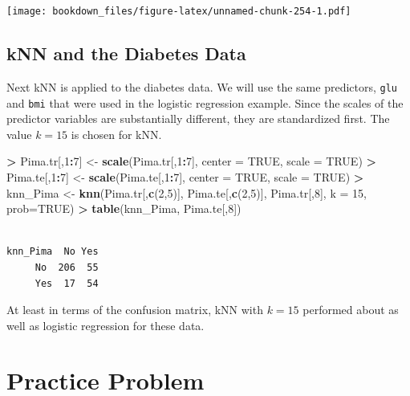 \documentclass[]{krantz}
\makeatletter
\newenvironment{Shaded}{\begin{snugshade}}{\end{snugshade}}
\newcommand{\KeywordTok}[1]{\textcolor[rgb]{0.27,0.27,0.27}{\textbf{#1}}}
\newcommand{\DataTypeTok}[1]{\textcolor[rgb]{0.27,0.27,0.27}{#1}}
\newcommand{\DecValTok}[1]{\textcolor[rgb]{0.06,0.06,0.06}{#1}}
\newcommand{\StringTok}[1]{\textcolor[rgb]{0.5,0.5,0.5}{#1}}
\newcommand{\OtherTok}[1]{\textcolor[rgb]{0.37,0.37,0.37}{#1}}
\newcommand{\OperatorTok}[1]{\textcolor[rgb]{0.43,0.43,0.43}{\textbf{#1}}}
\newcommand{\NormalTok}[1]{#1}
\newenvironment{kframe}{%
\medskip{}
\setlength{\fboxsep}{.8em}
 \def\at@end@of@kframe{}%
 \ifinner\ifhmode%
  \def\at@end@of@kframe{\end{minipage}}%
  \begin{minipage}{\columnwidth}%
 \fi\fi%
 \def\FrameCommand##1{\hskip\@totalleftmargin \hskip-\fboxsep
 \colorbox{shadecolor}{##1}\hskip-\fboxsep
     \hskip-\linewidth \hskip-\@totalleftmargin \hskip\columnwidth}%
 \MakeFramed {\advance\hsize-\width
   \@totalleftmargin\z@ \linewidth\hsize
   \@setminipage}}%
 {\par\unskip\endMakeFramed%
 \at@end@of@kframe}
\renewenvironment{Shaded}{\begin{kframe}}{\end{kframe}}
\makeatother
\begin{document}
\texttt{[image: bookdown\_files/figure-latex/unnamed-chunk-254-1.pdf]}

\subsection{kNN and the Diabetes Data}\label{knn-and-the-diabetes-data}

Next kNN is applied to the diabetes data. We will use the same
predictors, \texttt{glu} and \texttt{bmi} that were used in the logistic
regression example. Since the scales of the predictor variables are
substantially different, they are standardized first. The value \(k=15\)
is chosen for kNN.

\begin{Shaded}
\begin{Highlighting}[]
\OperatorTok{>}\StringTok{ }\NormalTok{Pima.tr[,}\DecValTok{1}\OperatorTok{:}\DecValTok{7}\NormalTok{] <-}\StringTok{ }\KeywordTok{scale}\NormalTok{(Pima.tr[,}\DecValTok{1}\OperatorTok{:}\DecValTok{7}\NormalTok{], }\DataTypeTok{center =} \OtherTok{TRUE}\NormalTok{, }\DataTypeTok{scale =} \OtherTok{TRUE}\NormalTok{)}
\OperatorTok{>}\StringTok{ }\NormalTok{Pima.te[,}\DecValTok{1}\OperatorTok{:}\DecValTok{7}\NormalTok{] <-}\StringTok{ }\KeywordTok{scale}\NormalTok{(Pima.te[,}\DecValTok{1}\OperatorTok{:}\DecValTok{7}\NormalTok{], }\DataTypeTok{center =} \OtherTok{TRUE}\NormalTok{, }\DataTypeTok{scale =} \OtherTok{TRUE}\NormalTok{)}
\OperatorTok{>}\StringTok{ }\NormalTok{knn_Pima <-}\StringTok{ }\KeywordTok{knn}\NormalTok{(Pima.tr[,}\KeywordTok{c}\NormalTok{(}\DecValTok{2}\NormalTok{,}\DecValTok{5}\NormalTok{)], Pima.te[,}\KeywordTok{c}\NormalTok{(}\DecValTok{2}\NormalTok{,}\DecValTok{5}\NormalTok{)], Pima.tr[,}\DecValTok{8}\NormalTok{], }\DataTypeTok{k =} \DecValTok{15}\NormalTok{, }\DataTypeTok{prob=}\OtherTok{TRUE}\NormalTok{)}
\OperatorTok{>}\StringTok{ }\KeywordTok{table}\NormalTok{(knn_Pima, Pima.te[,}\DecValTok{8}\NormalTok{])}
\end{Highlighting}
\end{Shaded}

\begin{verbatim}
        
knn_Pima  No Yes
     No  206  55
     Yes  17  54
\end{verbatim}

At least in terms of the confusion matrix, kNN with \(k=15\) performed
about as well as logistic regression for these data.

\section{Practice Problem}\label{practice-problem-13}
\end{document}
